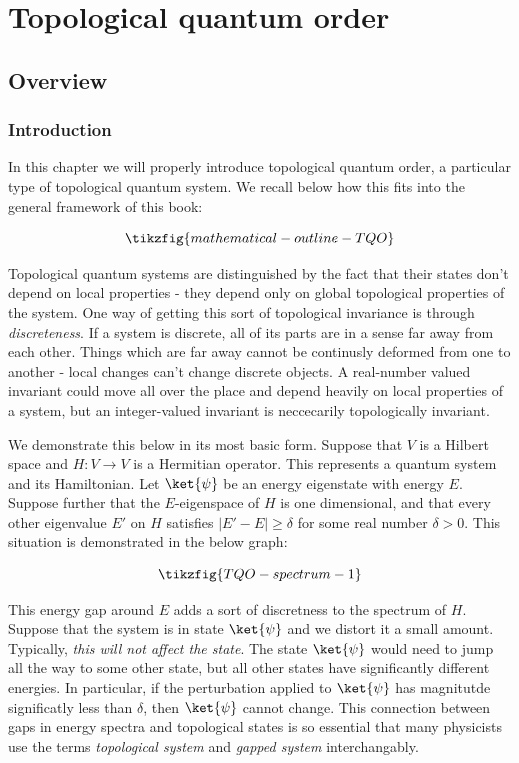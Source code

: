 \section{Topological quantum order}
\label{Topological quantum order}

\subsection{Overview}

\subsubsection{Introduction}

In this chapter we will properly introduce topological quantum order, a particular type of topological quantum system. We recall below how this fits into the general framework of this book:

\begin{equation*}
\tikzfig{mathematical-outline-TQO}
\end{equation*}

Topological quantum systems are distinguished by the fact that their states don't depend on local properties - they depend only on global topological properties of the system. One way of getting this sort of topological invariance is through {\em discreteness}. If a system is discrete, all of its parts are in a sense far away from each other. Things which are far away cannot be continusly deformed from one to another - local changes can't change discrete objects. A real-number valued invariant could move all over the place and depend heavily on local properties of a system, but an integer-valued invariant is neccecarily topologically invariant.

We demonstrate this below in its most basic form. Suppose that $V$ is a Hilbert space and $H:V\to V$ is a Hermitian operator. This represents a quantum system and its Hamiltonian. Let $\ket{\psi}$ be an energy eigenstate with energy $E$. Suppose further that the $E$-eigenspace of $H$ is one dimensional, and that every other eigenvalue $E'$ on $H$ satisfies $|E'-E|\geq \delta$ for some real number $\delta>0$. This situation is demonstrated in the below graph:

\begin{equation*}
\tikzfig{TQO-spectrum-1}
\end{equation*}

This energy gap around $E$ adds a sort of discretness to the spectrum of $H$. Suppose that the system is in state $\ket{\psi}$ and we distort it a small amount. Typically, \textit{this will not affect the state}. The state $\ket{\psi}$ would need to jump all the way to some other state, but all other states have significantly different energies. In particular, if the perturbation applied to $\ket{\psi}$ has magnitutde significatly less than $\delta$, then $\ket{\psi}$ cannot change. This connection between gaps in energy spectra and topological states is so essential that many physicists use the terms \textit{topological system} and \textit{gapped system} interchangably. 

